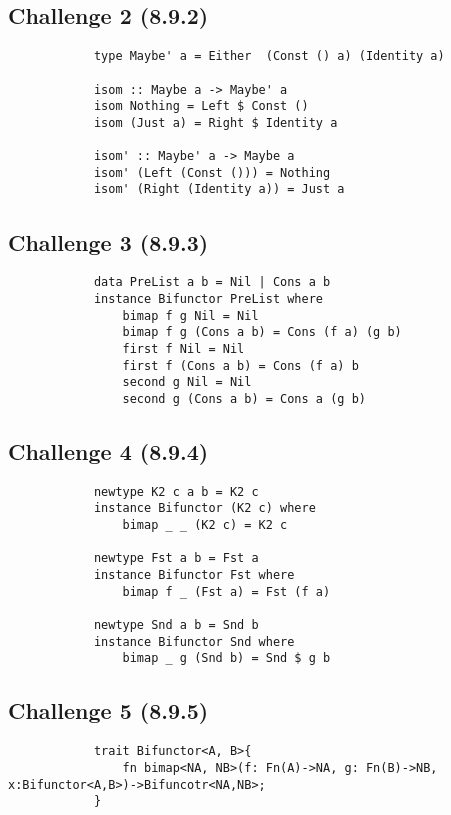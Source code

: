 \documentclass[11pt]{article}
\begin{document}
    \subsection*{Challenge 2 (8.9.2)}

        \begin{verbatim}
            type Maybe' a = Either  (Const () a) (Identity a)

            isom :: Maybe a -> Maybe' a
            isom Nothing = Left $ Const ()
            isom (Just a) = Right $ Identity a

            isom' :: Maybe' a -> Maybe a
            isom' (Left (Const ())) = Nothing
            isom' (Right (Identity a)) = Just a
        \end{verbatim}

    \subsection*{Challenge 3 (8.9.3)}

        \begin{verbatim}
            data PreList a b = Nil | Cons a b
            instance Bifunctor PreList where
                bimap f g Nil = Nil
                bimap f g (Cons a b) = Cons (f a) (g b)
                first f Nil = Nil
                first f (Cons a b) = Cons (f a) b
                second g Nil = Nil
                second g (Cons a b) = Cons a (g b)
        \end{verbatim}

    \subsection*{Challenge 4 (8.9.4)}

        \begin{verbatim}
            newtype K2 c a b = K2 c
            instance Bifunctor (K2 c) where 
                bimap _ _ (K2 c) = K2 c

            newtype Fst a b = Fst a
            instance Bifunctor Fst where
                bimap f _ (Fst a) = Fst (f a)

            newtype Snd a b = Snd b
            instance Bifunctor Snd where
                bimap _ g (Snd b) = Snd $ g b
        \end{verbatim}
    \subsection*{Challenge 5 (8.9.5)}
        \begin{verbatim}
            trait Bifunctor<A, B>{
                fn bimap<NA, NB>(f: Fn(A)->NA, g: Fn(B)->NB, x:Bifunctor<A,B>)->Bifuncotr<NA,NB>;
            }
        \end{verbatim}
\end{document}
